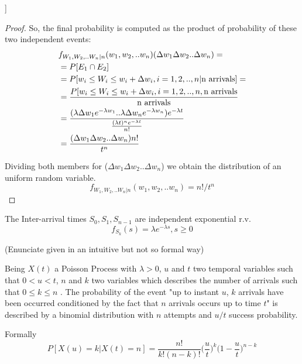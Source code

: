 \begin{theorem}[5.7, Joint probability of [$W_{1}$,..$W_{n}$]]
\begin{proof}
		So, the final probability is computed as the product of probability of these two independent events:
		\begin{equation}
			\begin{split}
				& f_{W_1,W_2,..W_n|n} (w_1,w_2,..w_n)( \Delta w_1\Delta w_2..\Delta w_n) = \\
				& =P[E_1 \cap E_2 ]\\
				& =P[w_i\leq W_i \leq w_i+\Delta w_i, i=1,2,..,n| \textnormal{n arrivals}]=\\
				& =\frac{P[w_i\leq W_i \leq w_i+\Delta w_i, i=1,2,..,n,\textnormal{n arrivals}}{\textnormal{n arrivals}}\\
				& =\frac{(\lambda \Delta w_1 e^{-\lambda w_1}..\lambda \Delta w_n e^{-\lambda w_n})e^{-\lambda t}}{\frac{(\lambda t)^{n}e^{-\lambda t}} {n!}}\\
				& =\frac{ (\Delta w_1 \Delta w_2.. \Delta w_n) n!}{t^n}
			\end{split}
		\end{equation}

		Dividing both members for ($\Delta w_1 \Delta w_2 .. \Delta w_n$) we obtain the distribution of an uniform random variable.
		\begin{equation}
			f_{W_1,W_2,..W_n|n} (w_1,w_2,..w_n) =n!/t^n
		\end{equation}
	\end{proof}
\end{theorem}

\begin{theorem}
	The Inter-arrival times $S_0,S_1, S_{n-1}$ are independent exponential r.v.
	\begin{equation}
		f_{S_k}(s)=\lambda e^{-\lambda s}, s \ge 0
	\end{equation}
\end{theorem}

\begin{theorem}
	(Enunciate given in an intuitive but not so formal way)

	Being $X(t)$ a Poisson Process with $\lambda>0$, $u$ and $t$ two temporal variables such that $0<u<t$, $n$ and $k$ two variables which describes the number of arrivals such that $0\leq k\leq n$ . The probability of the event "up to instant $u$, $k$ arrivals have been occurred conditioned by the fact that $n$ arrivals occurs up to time $t$" is described by a binomial distribution with $n$ attempts and $u/t$ success probability.

	Formally
	\begin{equation}
		P[X(u)=k|X(t)=n]= \frac{n!}{k!(n-k)!}\bigg(\frac{u}{t}\bigg)^k\bigg(1-\frac{u}{t}\bigg)^{n-k}
	\end{equation}
\end{theorem}

